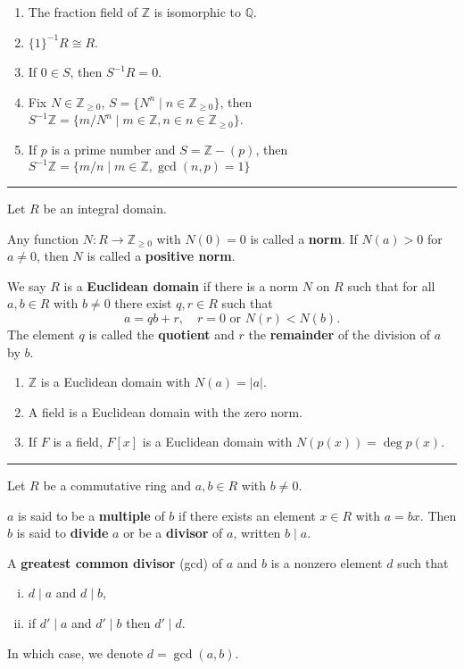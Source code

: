 \documentclass[12pt]{article}
\newcommand{\keyword}[1]{\textbf{#1}}
\newcommand{\sepline}{\rule{\textwidth}{0.4pt}}
\theoremstyle{definition}
\newcommand{\Z}{\mathbb{Z}}
\newcommand{\Zpos}{\mathbb{Z}_{\geq0}}
\newcommand{\Q}{\mathbb{Q}}
\newcommand{\<}{\left\langle}
\renewcommand{\>}{\right\rangle}
\newcommand{\isom}{\cong}
\newcommand{\divides}{\mid}
\begin{document}
\begin{enumerate}
    \item The fraction field of $\Z$ is isomorphic to $\Q$.
    
    \item $\{1\}^{-1}R \isom R$.
    
    \item If $0 \in S$, then $S^{-1}R = 0$.
    
    \item Fix $N \in \Zpos$, $S = \{N^n \mid n \in \Zpos\}$, then $S^{-1}\Z = \{m/N^n \mid m \in \Z, n \in n \in \Zpos\}$.
    
    \item If $p$ is a prime number and $S = \Z - (p)$, then $S^{-1}\Z = \{m/n \mid m \in \Z, \gcd(n, p) = 1\}$
\end{enumerate}
\sepline

Let $R$ be an integral domain.

Any function $N : R \to \Zpos$ with $N(0) = 0$ is called a \keyword{norm}. If $N(a) > 0$ for $a \ne 0$, then $N$ is called a \keyword{positive norm}.

We say $R$ is a \keyword{Euclidean domain} if there is a norm $N$ on $R$ such that for all $a, b \in R$ with $b \ne 0$ there exist $q, r \in R$ such that
\[
    a = qb + r, \quad r=0 \text{ or } N(r) < N(b).
\]
The element $q$ is called the \keyword{quotient} and $r$ the \keyword{remainder} of the division of $a$ by $b$.

\begin{enumerate}
    \item $\Z$ is a Euclidean domain with $N(a) = |a|$.
    
    \item A field is a Euclidean domain with the zero norm.
    
    \item If $F$ is a field, $F[x]$ is a Euclidean domain with $N(p(x)) = \deg p(x)$.
\end{enumerate}

\sepline

Let $R$ be a commutative ring and $a, b \in R$ with $b \ne 0$.

$a$ is said to be a \keyword{multiple} of $b$ if there exists an element $x \in R$ with $a = bx$. Then $b$ is said to \keyword{divide} $a$ or be a \keyword{divisor} of $a$, written $b \divides a$.

A \keyword{greatest common divisor} (gcd) of $a$ and $b$ is a nonzero element $d$ such that
\begin{enumerate}[(i)]
    \item $d \divides a$ and $d \divides b$,
    \item if $d' \divides a$ and $d' \divides b$ then $d' \divides d$.
\end{enumerate}
In which case, we denote $d = \gcd(a, b)$.
\end{document}

